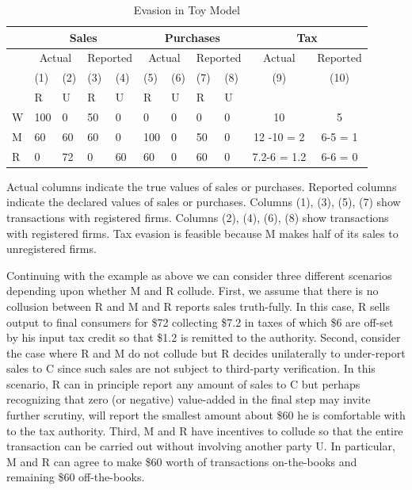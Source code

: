 \begin{table}[t]
\begin{threeparttable}
\caption{Evasion in Toy Model}
\begin{tabular}{|l|l|l|l|l|l|l|l|l|c|c|}
\hline
& \multicolumn{4}{|c|}{Sales} & \multicolumn{4}{|c|}{Purchases} & \multicolumn{2}{|c|}{Tax} \\ \hline
& \multicolumn{2}{|c|}{Actual} & \multicolumn{2}{|c|}{Reported} & \multicolumn{2}{|c|}{Actual} & \multicolumn{2}{|c|}{Reported} & Actual & Reported \\ \hline
& (1) & (2) & (3) & (4) & (5) & (6) & (7) & (8) & (9) & (10) \\ \hline
& R & U & R & U & R & U & R & U & & \\ \hline
W & 100 &0 & 50 & 0 & 0 & 0 & 0 & 0 & 10&5 \\ \hline
M & 60 & 60 & 60 & 0 & 100 & 0 & 50 & 0 & 12 -10 = 2 & 6-5 = 1\\ \hline 
R & 0 & 72 & 0 & 60 & 60 & 0 & 60 & 0 & 7.2-6 = 1.2 & 6-6 = 0 \\ \hline
\end{tabular}
\begin{tablenotes}
Actual columns indicate the true values of sales or purchases. Reported columns indicate the declared values of sales or purchases. Columns (1), (3), (5), (7) show transactions with registered firms. Columns (2), (4), (6), (8) show transactions with registered firms. Tax evasion is feasible because M makes half of its sales to unregistered firms.   
\end{tablenotes}
\label{tbl:evasion-desc}
\end{threeparttable}
\end{table}


Continuing with the example as above we can consider three different scenarios depending upon whether M and R collude.  First, we assume that there is no collusion between R and M and R reports sales truth-fully. In this case, R sells output to final consumers for \$72 collecting \$7.2 in taxes of which \$6 are off-set by his input tax credit so that \$1.2 is remitted to the authority. Second, consider the case where R and M do not collude but R decides unilaterally to under-report sales to C since such sales are not subject to third-party verification. In this scenario, R can in principle report any amount of sales to C but perhaps recognizing that zero (or negative) value-added in the final step may invite further scrutiny, will report the smallest amount about \$60 he is comfortable with to the tax authority. Third, M and R have incentives to collude so that the entire transaction can be carried out without involving another party U. In particular, M and R can agree to make \$60 worth of transactions on-the-books and remaining \$60 off-the-books.

